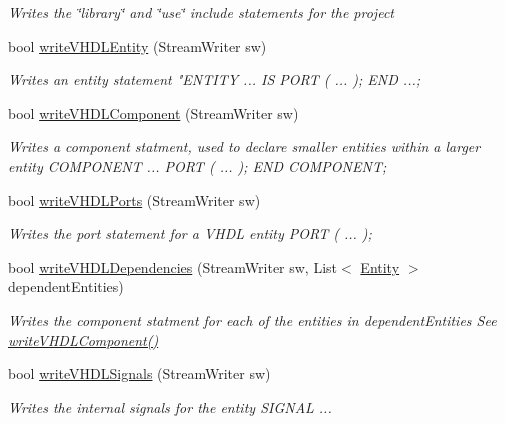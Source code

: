 \begin{DoxyCompactItemize}
\begin{DoxyCompactList}\small\item\em Writes the \char`\"{}library\char`\"{} and \char`\"{}use\char`\"{} include statements for the project \end{DoxyCompactList}\item 
bool \hyperlink{class_n_n_gen_1_1_entity_a9c1e22927e3bb62cbfbf391dc1c52301}{write\+V\+H\+D\+L\+Entity} (Stream\+Writer sw)
\begin{DoxyCompactList}\small\item\em Writes an entity statement "E\+N\+T\+I\+T\+Y ... I\+S P\+O\+R\+T ( ... ); E\+N\+D ...; \end{DoxyCompactList}\item 
bool \hyperlink{class_n_n_gen_1_1_entity_aee5c9d1fd7354d1b571f4d99043a0f51}{write\+V\+H\+D\+L\+Component} (Stream\+Writer sw)
\begin{DoxyCompactList}\small\item\em Writes a component statment, used to declare smaller entities within a larger entity C\+O\+M\+P\+O\+N\+E\+N\+T ... P\+O\+R\+T ( ... ); E\+N\+D C\+O\+M\+P\+O\+N\+E\+N\+T; \end{DoxyCompactList}\item 
bool \hyperlink{class_n_n_gen_1_1_entity_a9e1d15aff6a09e55419661983923e4b7}{write\+V\+H\+D\+L\+Ports} (Stream\+Writer sw)
\begin{DoxyCompactList}\small\item\em Writes the port statement for a V\+H\+D\+L entity P\+O\+R\+T ( ... ); \end{DoxyCompactList}\item 
bool \hyperlink{class_n_n_gen_1_1_entity_a841b967c6c90e24c6d5fe9ad2a420751}{write\+V\+H\+D\+L\+Dependencies} (Stream\+Writer sw, List$<$ \hyperlink{class_n_n_gen_1_1_entity}{Entity} $>$ dependent\+Entities)
\begin{DoxyCompactList}\small\item\em Writes the component statment for each of the entities in dependent\+Entities See \hyperlink{class_n_n_gen_1_1_entity_aee5c9d1fd7354d1b571f4d99043a0f51}{write\+V\+H\+D\+L\+Component()} \end{DoxyCompactList}\item 
bool \hyperlink{class_n_n_gen_1_1_entity_afb8bc38d1bea3b52be2557c2447942ef}{write\+V\+H\+D\+L\+Signals} (Stream\+Writer sw)
\begin{DoxyCompactList}\small\item\em Writes the internal signals for the entity S\+I\+G\+N\+A\+L ... \end{DoxyCompactList}\item 

\end{DoxyCompactItemize}
